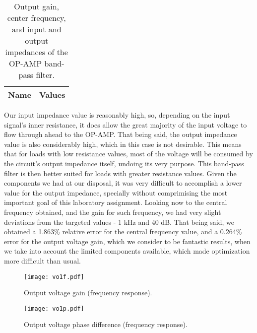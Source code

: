\begin{table}[h]
  \centering
  \begin{tabular}{|l|r|}
    \hline    
    {\bf Name} & {\bf Values} \\ \hline
    
         
  \end{tabular}
  \caption{Output gain, center frequency, and input and output impedances of the OP-AMP band-pass filter.}
  \label{tab:main}
\end{table}

Our input impedance value is reasonably high, so, depending on the input signal's inner resistance, it does allow the great majority of the input voltage to flow through ahead to the OP-AMP. That being said, the output impedance value is also considerably high, which in this case is not desirable. This means that for loads with low resistance values, most of the voltage will be consumed by the circuit's output impedance itself, undoing its very purpose. This band-pass filter is then better suited for loads with greater resistance values. Given the components we had at our disposal, it was very difficult to accomplish a lower value for the output impedance, specially without comprimising the most important goal of this laboratory assignment.
Looking now to the central frequency obtained, and the gain for such frequency, we had very slight deviations from the targeted values - 1 kHz and 40 dB. That being said, we obtained a 1.863\% relative error for the central frequency value, and a 0.264\% error for the output voltage gain, which we consider to be fantastic results, when we take into account the limited components available, which made optimization more difficult than usual.

\begin{figure}[h!] \centering
\texttt{[image: vo1f.pdf]}
\caption{Output voltage gain (frequency response).}
\label{fig:gainstage}
\end{figure}

\begin{figure}[h!] \centering
\texttt{[image: vo1p.pdf]}
\caption{Output voltage phase difference (frequency response).}
\label{fig:outputstage}
\end{figure}

